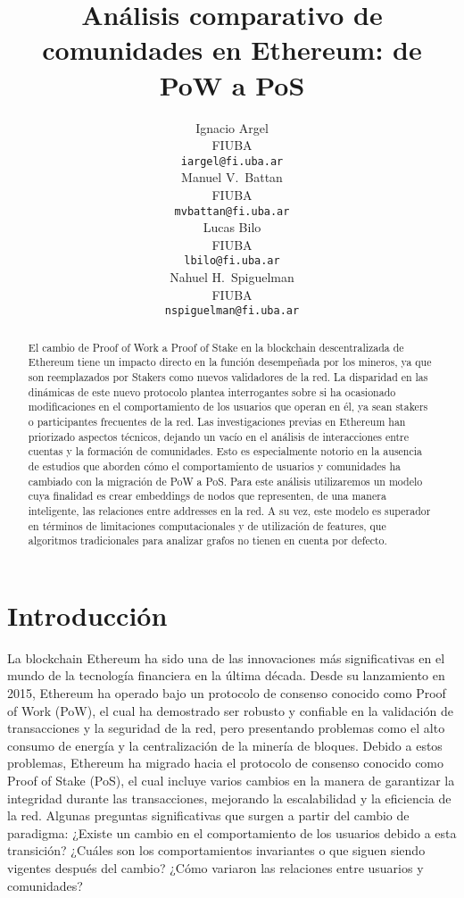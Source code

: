 \documentclass{article}
\title{Análisis comparativo de comunidades en Ethereum: de PoW a PoS}
\author{{
	\hspace{1mm}Ignacio Argel} \\
	FIUBA\\
	\texttt{iargel@fi.uba.ar} \\
	\And
	{\hspace{1mm}Manuel V.~Battan} \\
	FIUBA\\
	\texttt{mvbattan@fi.uba.ar} \\
	\AND
	{\hspace{1mm}Lucas Bilo} \\
	FIUBA\\
	\texttt{lbilo@fi.uba.ar} \\
	\And
	{\hspace{1mm}Nahuel H.~Spiguelman} \\
	FIUBA\\
	\texttt{nspiguelman@fi.uba.ar} \\
}
\begin{document}
\maketitle

\begin{abstract}
El cambio de Proof of Work a Proof of Stake en la blockchain descentralizada de Ethereum tiene un impacto directo en la función desempeñada por los mineros, ya que son reemplazados por Stakers como nuevos validadores de la red. La disparidad en las dinámicas de este nuevo protocolo plantea interrogantes sobre si ha ocasionado modificaciones en el comportamiento de los usuarios que operan en él, ya sean stakers o participantes frecuentes de la red.
Las investigaciones previas en Ethereum han priorizado aspectos técnicos, dejando un vacío en el análisis de interacciones entre cuentas y la formación de comunidades. Esto es especialmente notorio en la ausencia de estudios que aborden cómo el comportamiento de usuarios y comunidades ha cambiado con la migración de PoW a PoS.
Para este análisis utilizaremos un modelo cuya finalidad es crear embeddings de nodos que representen, de una manera inteligente, las relaciones entre addresses en la red. A su vez, este modelo es superador en términos de limitaciones computacionales y de utilización de features, que algoritmos tradicionales para analizar grafos no tienen en cuenta por defecto.

\end{abstract}
\clearpage

\section{Introducción}

La blockchain Ethereum ha sido una de las innovaciones más significativas en el mundo de la tecnología financiera en la última década. Desde su lanzamiento en 2015, Ethereum ha operado bajo un protocolo de consenso conocido como Proof of Work (PoW), el cual ha demostrado ser robusto y confiable en la validación de transacciones y la seguridad de la red, pero presentando problemas como el alto consumo de energía y la centralización de la minería de bloques. Debido a estos problemas, Ethereum ha migrado hacia el protocolo de consenso conocido como Proof of Stake (PoS), el cual incluye varios cambios en la manera de garantizar la integridad durante las transacciones, mejorando la escalabilidad y la eficiencia de la red.
Algunas preguntas significativas que surgen a partir del cambio de paradigma: ¿Existe un cambio en el comportamiento de los usuarios debido a esta transición? ¿Cuáles son los comportamientos invariantes o que siguen siendo vigentes después del cambio? ¿Cómo variaron las relaciones entre usuarios y comunidades?
\end{document}
